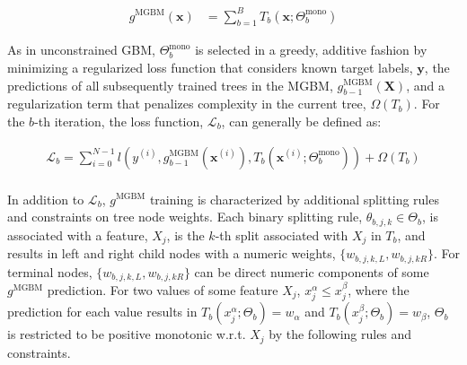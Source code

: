 \documentclass[information,article,submit,moreauthors,pdftex]{definitions/mdpi}
\begin{document}
\begin{equation}
\begin{aligned}\label{eq:rf}
g^{\text{MGBM}}(\mathbf{x}) &= \sum_{b=1}^B T_b\left(\mathbf{x}; \Theta^\text{mono}_b\right)
\end{aligned}
\end{equation}

\noindent As in unconstrained GBM, $\Theta^{\text{mono}}_b$ is selected in a greedy, additive fashion by minimizing a regularized loss function that considers known target labels, $\mathbf{y}$, the predictions of all subsequently trained trees in the MGBM, $g^{\text{MGBM}}_{b-1}(\mathbf{X})$, and a regularization term that penalizes complexity in the current tree, $\Omega(T_b)$. For the $b$-th iteration, the loss function, $\mathcal{L}_{b}$, can generally be defined as:

\begin{equation}
\begin{aligned}
\mathcal{L}_{b} =\sum_{i=0}^{N-1}l(y^{(i)}, g^{\text{MGBM}}_{b-1}(\mathbf{x}^{(i)}), T_b(\mathbf{x}^{(i)};\Theta^\text{mono}_b)) + \Omega(T_b)\\
\end{aligned}
\end{equation}

\noindent In addition to $\mathcal{L}_{b}$, $g^\text{MGBM}$ training is characterized by additional splitting rules and constraints on tree node weights. Each binary splitting rule, $\theta_{b,j,k} \in \Theta_b$, is associated with a feature, $X_j$, is the $k$-th split associated with $X_j$ in $T_b$, and results in left and right child nodes with a numeric weights, $\{w_{b,j,k,L}, w_{b,j,kR}\}$. For terminal nodes, $\{w_{b,j,k,L}, w_{b,j,kR}\}$ can be direct numeric components of some $g^\text{MGBM}$ prediction. For two values of some feature $X_j$, $x^{\alpha}_j \le x^{\beta}_j$, where the prediction for each value results in $T_b(x^{\alpha}_j; \Theta_b) = w_\alpha$ and $T_b(x^{\beta}_j; \Theta_b) = w_\beta$, $\Theta_b$ is restricted to be positive monotonic w.r.t. $X_j$ by the following rules and constraints.
\end{document}
